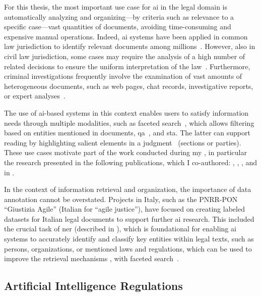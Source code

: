 For this thesis, the most important use case for \ac{ai} in the legal domain is automatically analyzing and organizing---\eg by criteria such as relevance to a specific case---vast quantities of documents, avoiding time-consuming and expensive manual operations. Indeed, \ac{ai} systems have been applied in common law jurisdiction to identify relevant documents among millions~\cite{juliahb2024}. However, also in civil law jurisdiction, some cases may require the analysis of a high number of related decisions to ensure the uniform interpretation of the law~\cite{egea2024does}. Furthermore, criminal investigations frequently involve the examination of vast amounts of heterogeneous documents, such as web pages, chat records, investigative reports, or expert analyses~\cite{szekely2015building,real_batini2021semantic,pozzi_wise_2025}.

The use of \ac{ai}-based systems in this context enables users to satisfy information needs through multiple modalities, such as faceted search~\cite{kejriwal2017searchengine}, which allows filtering based on entities mentioned in documents, \acl{qa}~\cite{hoppe_2021_legalqa_german,sovrano2020legal}, and \acl{sta}. The latter can support reading by highlighting salient elements in a judgment~\cite{swoopes2025interfacedesignsupportlegal,ziwei_abstractexplorer_2025,raymond_skimming_sci_2023} (\eg sections or parties). These use cases motivate part of the work conducted during my \phd, in particular the research presented in the following publications, which I co-authored: \textcite{pozzi_wise_2025}, \textcite{BELLANDI2024}, \textcite{aixia_2023}, and in .



In the context of information retrieval and organization, the importance of data annotation cannot be overstated. Projects in Italy, such as the PNRR-PON ``Giustizia Agile'' (Italian for ``agile justice''), have focused on creating labeled datasets for Italian legal documents to support further \ac{ai} research. This included the crucial task of \acf{ner} (described in ), which is foundational for enabling \ac{ai} systems to accurately identify and classify key entities within legal texts, such as persons, organizations, or mentioned laws and regulations, which can be used to improve the retrieval mechanisms \cite{juliahb2024}, \eg with faceted search~\cite{ARMENTANO2014_nlp_faceted,hearst_2006_faceted}.

\subsection{Artificial Intelligence Regulations}

